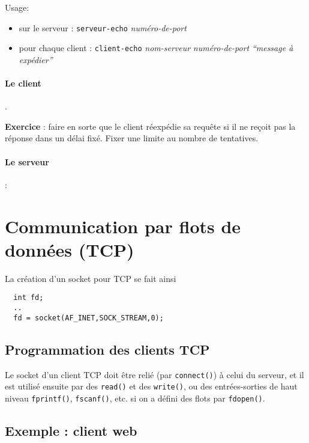 Usage:
\begin{itemize}
\item  sur le serveur : \texttt{serveur-echo} \emph{numéro-de-port} 
\item 
pour chaque client : \texttt{client-echo} \emph{nom-serveur}
\emph{numéro-de-port} \emph{``message à expédier''}
\end{itemize}

\paragraph{Le client}.

 
\source



\textbf{Exercice} : faire en sorte que le client réexpédie sa requête
si il ne reçoit pas la réponse dans un délai fixé. Fixer une limite
au nombre
de tentatives. 

\paragraph{Le serveur} :

 
\source



\section{Communication par flots de données (TCP)}

La création d'un socket pour TCP se fait ainsi

\extrait
\begin{lstlisting}
  int fd;
  ..
  fd = socket(AF_INET,SOCK_STREAM,0);
  \end{lstlisting}


\subsection{Programmation des clients TCP}

Le socket d'un client TCP doit être relié (par \texttt{connect()}) à celui
du serveur, et il est utilisé ensuite par des \texttt{read()} et des
\texttt{write()}, ou des entrées-sorties de haut niveau \texttt{fprintf()},
\texttt{fscanf()}, etc. si on a défini des flots par \texttt{fdopen()}.



\subsection{Exemple : client web}

